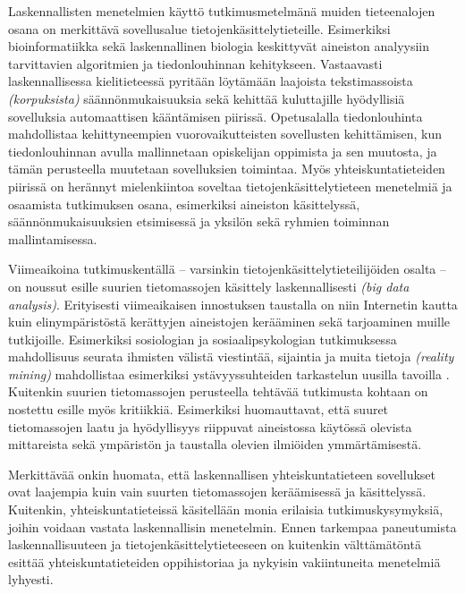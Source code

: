 \documentclass[finnish,gradu,twoside,12pt]{tktltiki}
\begin{document}
Laskennallisten menetelmien käyttö tutkimusmetelmänä muiden tieteenalojen osana on merkittävä sovellusalue tietojenkäsittelytieteille. Esimerkiksi bioinformatiikka sekä laskennallinen biologia keskittyvät aineiston analyysiin tarvittavien algoritmien ja tiedonlouhinnan kehitykseen. Vastaavasti laskennallisessa kielitieteessä pyritään löytämään laajoista tekstimassoista \textit{(korpuksista)} säännönmukaisuuksia sekä kehittää kuluttajille hyödyllisiä sovelluksia automaattisen kääntämisen piirissä. Opetusalalla tiedonlouhinta mahdollistaa kehittyneempien vuorovaikutteisten sovellusten kehittämisen, kun tiedonlouhinnan avulla mallinnetaan opiskelijan oppimista ja sen muutosta, ja tämän perusteella muutetaan sovelluksien toimintaa. Myös yhteiskuntatieteiden piirissä on herännyt mielenkiintoa soveltaa tietojenkäsittelytieteen menetelmiä ja osaamista tutkimuksen osana, esimerkiksi aineiston käsittelyssä, säännönmukaisuuksien etsimisessä ja yksilön sekä ryhmien toiminnan mallintamisessa.

Viimeaikoina tutkimuskentällä -- varsinkin tietojenkäsittelytieteilijöiden osalta -- on noussut esille suurien tietomassojen käsittely laskennallisesti \textit{(big data analysis)}. Erityisesti viimeaikaisen innostuksen taustalla on niin Internetin kautta \citep{adamic05,notess02} kuin elinympäristöstä kerättyjen aineistojen \citep{eagle06,oulasvirta12} kerääminen sekä tarjoaminen muille tutkijoille. Esimerkiksi sosiologian ja sosiaalipsykologian tutkimuksessa mahdollisuus seurata ihmisten välistä viestintää, sijaintia ja muita tietoja \textit{(reality mining)} mahdollistaa esimerkiksi ystävyyssuhteiden tarkastelun uusilla tavoilla \cite{Karikoski2011a,Nelimarkka2012}. Kuitenkin suurien tietomassojen perusteella tehtävää tutkimusta kohtaan on nostettu esille myös kritiikkiä. Esimerkiksi \citet{Boyd2012a} huomauttavat, että suuret tietomassojen laatu ja hyödyllisyys riippuvat aineistossa käytössä olevista mittareista sekä ympäristön ja taustalla olevien ilmiöiden ymmärtämisestä.

Merkittävää onkin huomata, että laskennallisen yhteiskuntatieteen sovellukset ovat laajempia kuin vain suurten tietomassojen keräämisessä ja käsittelyssä. Kuitenkin, yhteiskuntatieteissä käsitellään monia erilaisia tutkimuskysymyksiä, joihin voidaan vastata laskennallisin menetelmin. Ennen tarkempaa paneutumista laskennallisuuteen ja tietojenkäsittelytieteeseen on kuitenkin välttämätöntä esittää yhteiskuntatieteiden oppihistoriaa ja nykyisin vakiintuneita menetelmiä lyhyesti.

\end{document}
